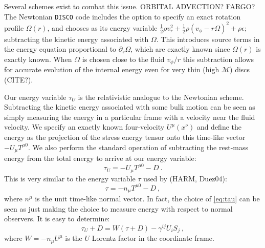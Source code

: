 \documentclass{emulateapj}
\newcommand{\eps}{\epsilon}
\newcommand{\Om}{\Omega}
\newcommand{\Mach}{\mathcal{M}}
\newcommand{\pd}{\partial}
\newcommand{\DISCO}{{\texttt{DISCO}}}
\begin{document}
Several schemes exist to combat this issue.  ORBITAL ADVECTION? FARGO? The Newtonian \DISCO{} code includes the option to specify an exact rotation profile $\Om(r)$, and chooses as its energy variable $\frac{1}{2}\rho v_r^2 + \frac{1}{2}\rho(v_\phi-r\Om)^2 + \rho \eps$; subtracting the kinetic energy associated with $\Om$. This introduces source terms in the energy equation proportional to $\pd_r \Om$, which are exactly known since $\Om(r)$ is exactly known.  When $\Om$ is chosen close to the fluid $v_\phi / r$ this subtraction allows for accurate evolution of the internal energy even for very thin (high $\Mach$) discs (CITE?).

Our energy variable $\tau_U$ is the relativistic analogue to the Newtonian scheme.  Subtracting the kinetic energy associated with some bulk motion can be seen as simply measuring the energy in a particular frame with a velocity near the fluid velocity. We specify an exactly known four-velocity $U^\mu(x^\nu)$ and define the energy as the projection of the stress energy tensor onto this time-like vector $-U_\mu T^{\mu 0}$.  We also perform the standard operation of subtracting the rest-mass energy from the total energy to arrive at our energy variable:
\begin{equation}
	\tau_U = -U_\mu T^{\mu 0} - D \ . \label{eq:tauU}
\end{equation}
This is very similar to the energy variable $\tau$ used by (HARM, Duez04):
\begin{equation}
	\tau = -n_\mu T^{\mu 0} - D \ , \label{eq:tau}
\end{equation}
where $n^\mu$ is the unit time-like normal vector. In fact, the choice of \eqref{eq:tau} can be seen as just making the choice to measure energy with respect to normal observers.  It is easy to determine: %
\begin{equation}
\tau_U + D = W\left(\tau + D\right) - \gamma^{ij}U_i S_j  \ ,
\end{equation}
where $W = -n_\mu U^\mu$ is the $U$ Lorentz factor in the coordinate frame.
\end{document}
